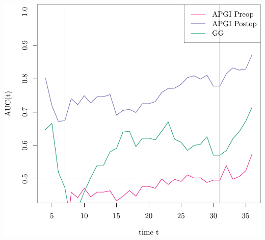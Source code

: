 \documentclass{article}\usepackage[]{graphicx}\usepackage[]{color}
\makeatletter
\def\maxwidth{ %
  \ifdim\Gin@nat@width>\linewidth
    \linewidth
  \else
    \Gin@nat@width
  \fi
}
\newenvironment{knitrout}{}{} %
\makeatother
\begin{document}
\begin{knitrout}
{\centering \includegraphics[width=\maxwidth]{figure/07-timeROC-apgi-1} 

}



\end{knitrout}
\end{document}
